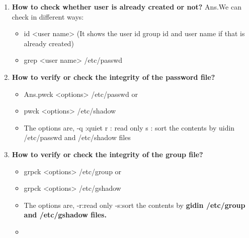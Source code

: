 \begin{enumerate}
    \item\textbf{How to check whether user is already created or not?}
    \newline
     Ans.We can check in different ways:
     \begin{itemize}
     	\item id   <user name>   (It shows the user id group id and user name if that is already created)
     	\item grep <user name> /etc/passwd
     \end{itemize}
         
    \bigskip
    \bigskip
    
    \item\textbf{How to verify or check the integrity of the password file?}
    \newline
    \begin{itemize}
        \item Ans.pwck   <options>   /etc/passwd    or
        \item pwck   <options>   /etc/shadow 
        \item The options are,   -q :quiet
              r : read only	
              s : sort the contents by uidin /etc/passwd and  /etc/shadow  files
    \end{itemize}

    \bigskip
    \bigskip

    \item\textbf{How to verify or check the integrity of the group file?}
    \newline
    \begin{itemize}
        \item grpck   <options>   /etc/group    or
        \item grpck   <options>   /etc/gshadow 
        \item The options are,    -r:read only
                                  -s:sort the contents by  \textbf{gidin  /etc/group   and   /etc/gshadow files.}
    
    \bigskip  
    \bigskip
    
    \item\textbf{}


    \end{itemize}



\end{enumerate}
